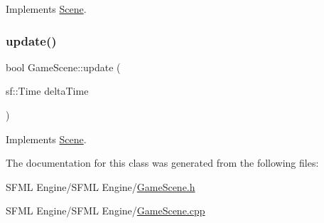 Implements \hyperlink{class_scene_af25e4d2c998aca4e95899fb67488e815}{Scene}.

\hypertarget{class_game_scene_ae54628d2f041bcad66242584b2db10d6}{}\label{class_game_scene_ae54628d2f041bcad66242584b2db10d6} 
\subsubsection{\texorpdfstring{update()}{update()}}
{\footnotesize\ttfamily bool Game\+Scene\+::update (\begin{DoxyParamCaption}\item[{sf\+::\+Time}]{delta\+Time }\end{DoxyParamCaption})\hspace{0.3cm}{\ttfamily [virtual]}}



Implements \hyperlink{class_scene_a72683c984a1da2ce4f757705e93730f2}{Scene}.



The documentation for this class was generated from the following files\+:\begin{DoxyCompactItemize}
\item 
S\+F\+M\+L Engine/\+S\+F\+M\+L Engine/\hyperlink{_game_scene_8h}{Game\+Scene.\+h}\item 
S\+F\+M\+L Engine/\+S\+F\+M\+L Engine/\hyperlink{_game_scene_8cpp}{Game\+Scene.\+cpp}\end{DoxyCompactItemize}
